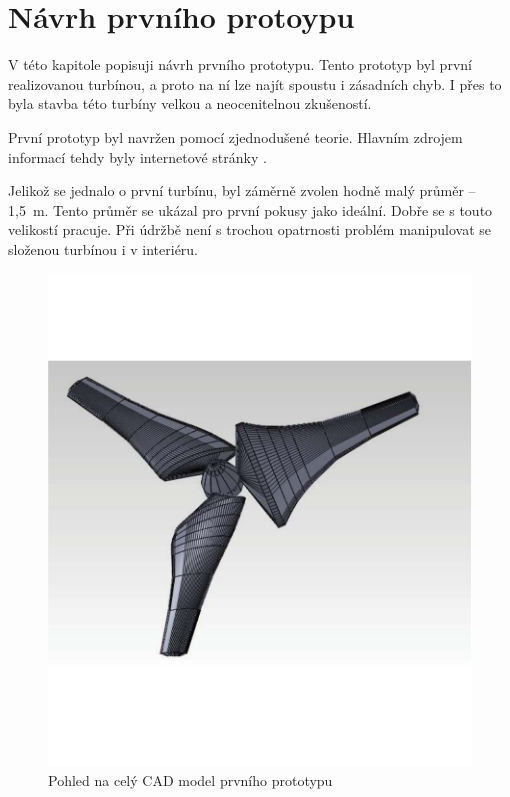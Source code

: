 \chapter{Návrh prvního protoypu}
V této kapitole popisuji návrh prvního prototypu. Tento prototyp byl první realizovanou turbínou, a proto na ní lze najít spoustu i zásadních chyb. I přes to byla stavba této turbíny velkou a neocenitelnou zkušeností.

První prototyp byl navržen pomocí zjednodušené teorie. Hlavním zdrojem informací tehdy byly internetové stránky \cite{ve:ve}. 

Jelikož se jednalo o první turbínu, byl záměrně zvolen hodně malý průměr – 1,5~m. Tento průměr se ukázal pro první pokusy jako ideální. Dobře se s touto velikostí pracuje. Při údržbě není s trochou opatrnosti problém manipulovat se složenou turbínou i v interiéru.

\begin{figure}[H]
	\centering
	\includegraphics[]{obrazky/prot1p}
	\caption{Pohled na celý CAD model prvního prototypu}
	\label{prot1}
\end{figure}

